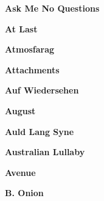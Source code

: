\vspace{10pt} 
\begin{center}\textbf{Ask Me No Questions}\end{center}
\newline
\vspace{10pt} 
\begin{center}\textbf{At Last}\end{center}
\newline
\vspace{10pt} 
\begin{center}\textbf{Atmosfarag}\end{center}
\newline
\vspace{10pt} 
\begin{center}\textbf{Attachments}\end{center}
\newline
\vspace{10pt} 
\begin{center}\textbf{Auf Wiedersehen}\end{center}
\newline
\vspace{10pt} 
\begin{center}\textbf{August}\end{center}
\newline
\vspace{10pt} 
\begin{center}\textbf{Auld Lang Syne}\end{center}
\newline
\vspace{10pt} 
\begin{center}\textbf{Australian Lullaby}\end{center}
\newline
\vspace{10pt} 
\begin{center}\textbf{Avenue}\end{center}
\newline
\vspace{10pt} 
\begin{center}\textbf{B. Onion}\end{center}
